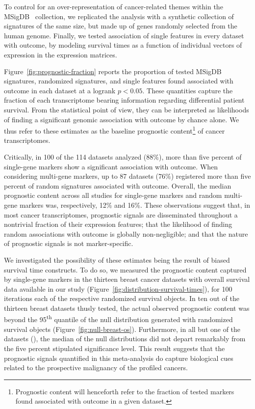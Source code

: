 To control for an over-representation of cancer-related themes within the
\mbox{MSigDB } collection, we replicated the analysis with a
synthetic collection of signatures of the same size, but made up of genes
randomly selected from the human genome.  Finally, we tested association of
single features in every dataset with outcome, by modeling survival times as a
function of individual vectors of expression in the expression matrices.

Figure~\ref{fig:prognostic-fraction} reports the proportion of tested
\mbox{MSigDB } signatures, randomized signatures, and single
features found associated with outcome in each dataset at a logrank $p<0.05$.
These quantities capture the fraction of each transcriptome bearing information
regarding differential patient survival.  From the statistical point of view,
they can be interpreted as likelihoods of finding a significant genomic
association with outcome by chance alone.  We thus refer to these estimates as
the baseline prognostic content\footnote{Prognostic content will henceforth
  refer to the fraction of tested markers found associated with outcome in a
  given dataset.} of cancer transcriptomes.

Critically, in 100 of the 114 datasets analyzed (88\%), more than five percent
of single-gene markers show a significant association with outcome.  When
considering multi-gene markers, up to 87 datasets (76\%) registered more than
five percent of random signatures associated with outcome.  Overall, the median
prognostic content across all studies for single-gene markers and random
multi-gene markers was, respectively, 12\% and 16\%.  These observations suggest
that, in most cancer transcriptomes, prognostic signals are disseminated
throughout a nontrivial fraction of their expression features; that the
likelihood of finding random associations with outcome is globally
non-negligible; and that the nature of prognostic signals is not
marker-specific.

We investigated the possibility of these estimates being the result of biased
survival time constructs.  To do so, we measured the prognostic content captured
by single-gene markers in the thirteen breast cancer datasets with overall
survival data available in our study
(Figure~\ref{fig:distribution-survival-times}), for \num{100} iterations each of
the respective randomized survival objects.  In ten out of the thirteen breast
datasets thusly tested, the actual observed prognostic content was beyond the
95\textsuperscript{th} quantile of the null distribution generated with
randomized survival objects (Figure~\ref{fig:null-breast-os}).  Furthermore, in
all but one of the datasets (), the median of the null
distributions did not depart remarkably from the five percent stipulated
significance level.  This result suggests that the prognostic signals quantified
in this meta-analysis do capture biological cues related to the prospective
malignancy of the profiled cancers.

